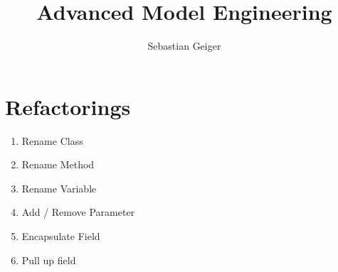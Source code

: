 \documentclass[a4paper,10pt]{article}
\title{Advanced Model Engineering}
\author{Sebastian Geiger}
\begin{document}
\maketitle

\begin{abstract}

\end{abstract}

\section{Refactorings}
\begin{enumerate}
 \item Rename Class
 \item Rename Method
 \item Rename Variable
 \item Add / Remove Parameter
 \item Encapsulate Field
 \item Pull up field
\end{enumerate}
\end{document}
